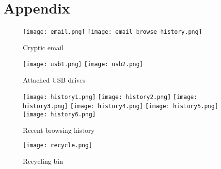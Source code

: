 \section{Appendix}

\begin{figure}[h]
    \centering
    \texttt{[image: email.png]}
    \texttt{[image: email\_browse\_history.png]}
    \caption{Cryptic email}
    \label{fig:email}
\end{figure}

\begin{figure}[h]
    \centering
    \texttt{[image: usb1.png]}
    \texttt{[image: usb2.png]}
    \caption{Attached USB drives}
    \label{fig:usb}
\end{figure}

\begin{figure}[h]
    \centering
    \texttt{[image: history1.png]}
    \texttt{[image: history2.png]}
    \texttt{[image: history3.png]}
    \texttt{[image: history4.png]}
    \texttt{[image: history5.png]}
    \texttt{[image: history6.png]}
    \caption{Recent browsing history}
    \label{fig:webhistory}
\end{figure}

\begin{figure}[h]
    \centering
    \texttt{[image: recycle.png]}
    \caption{Recycling bin}
    \label{recycle}
\end{figure}
